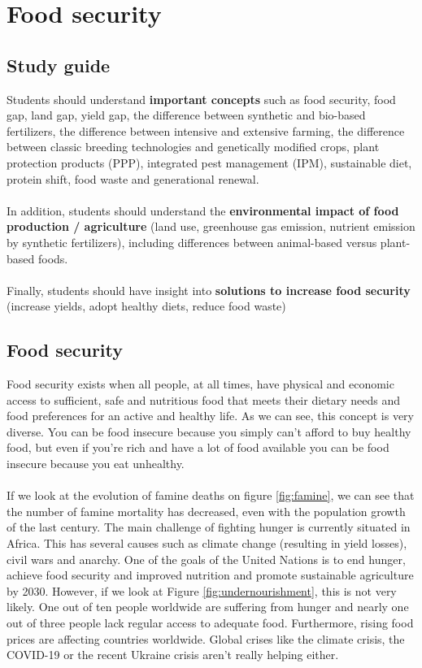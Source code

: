 \documentclass[../summary.tex]{subfiles}
\begin{document}
	
	\section{Food security}
	
	\subsection{Study guide}
	
	Students should understand \textbf{important concepts} such as food security, food gap, land gap, yield gap, the difference between synthetic and bio-based fertilizers, the difference between intensive and extensive farming, the difference between classic breeding technologies and genetically modified crops, plant protection products (PPP), integrated pest management (IPM), sustainable diet, protein shift, food waste and generational renewal.
	\\\\
	In addition, students should understand the \textbf{environmental impact of food production / agriculture} (land use, greenhouse gas emission, nutrient emission by synthetic fertilizers), including differences between animal-based versus plant-based foods.
	\\\\
	Finally, students should have insight into \textbf{solutions to increase food security} (increase yields, adopt healthy
	diets, reduce food waste)
	
	\subsection{Food security}
	
	Food security exists when all people, at all times, have physical and economic access to sufficient, safe and nutritious food that meets their dietary needs and food preferences for an active and healthy life. As we can see, this concept is very diverse. You can be food insecure because you simply can't afford to buy healthy food, but even if you're rich and have a lot of food available you can be food insecure because you eat unhealthy. 
	\\\\
	If we look at the evolution of famine deaths on figure \ref{fig:famine}, we can see that the number of famine mortality has decreased, even with the population growth of the last century. The main challenge of fighting hunger is currently situated in Africa. This has several causes such as climate change (resulting in yield losses), civil wars and anarchy. One of the goals of the United Nations is to end hunger, achieve food security and improved nutrition and promote sustainable agriculture by 2030. However, if we look at Figure \ref{fig:undernourishment}, this is not very likely. One out of ten people worldwide are suffering from hunger and nearly one out of three people lack regular access to adequate food. Furthermore, rising food prices are affecting countries worldwide. Global crises like the climate crisis, the COVID-19  or the recent Ukraine crisis aren't really helping either.
	
\end{document}
